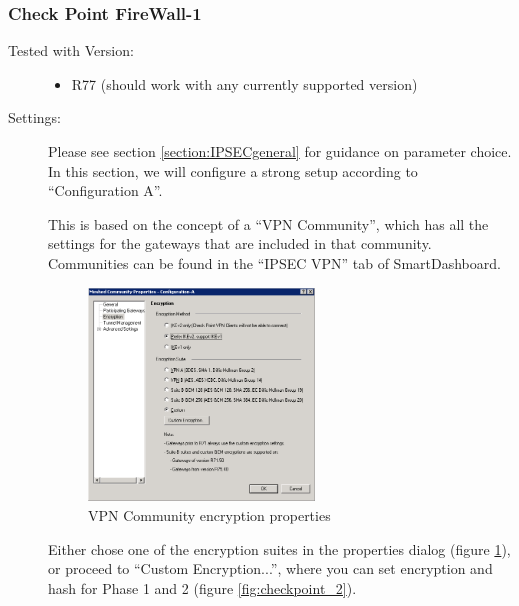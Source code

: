 \subsubsection{Check Point FireWall-1}
   
\begin{description}
\item[Tested with Version:] \mbox{}

\begin{itemize}
\item R77 (should work with any currently supported version)
\end{itemize}

\item[Settings:] \mbox{}

Please see section \ref{section:IPSECgeneral} for guidance on
parameter choice. In this section, we will configure a strong setup
according to ``Configuration A''.

This is based on the concept of a ``VPN Community'', which has all the
settings for the gateways that are included in that community.
Communities can be found in the ``IPSEC VPN'' tab of SmartDashboard.

\begin{figure}[p]
  \centering
  \includegraphics[width=0.592\textwidth]{checkpoint_1.png}
  \caption{VPN Community encryption properties}
  \label{fig:checkpoint_1}
\end{figure}

Either chose one of the encryption suites in the properties dialog
(figure \ref{fig:checkpoint_1}), or proceed to
``Custom Encryption...'', where you can set encryption and hash for
Phase 1 and 2 (figure \ref{fig:checkpoint_2}).


\end{description}
